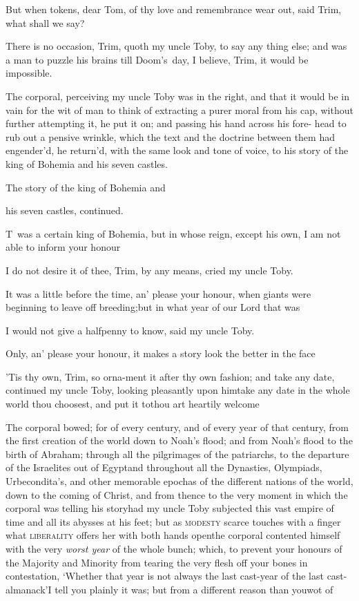 \documentclass{article}
\begin{document}
\tsh But when tokens, dear Tom, of thy love and
remembrance wear out, said Trim, what shall we say?

There is no occasion, Trim, quoth my uncle Toby,
to say any thing else; and was a man to puzzle his brains till
Doom’s~day, I believe, Trim, it would be
impossible.

The corporal, perceiving my uncle Toby was in the right,
and that it would be in vain for the wit of man to think of
extracting a purer moral from his cap, without further attempting
it, he put it on; and passing his hand across his fore- head to rub
out a pensive wrinkle, which the text and the doctrine between them
had engender’d, he return’d, with the same look and
tone of voice, to his story of the king of Bohemia and his
seven castles.

\vfill {} \eject\null\smallskip
\centerline{The story of the king of Bohemia and}
\centerline{his seven castles, continued.}

\lettrine{T}{\,} was a certain king of\break
Bohemia, but in whose reign, except his
own, I am not able to inform your honour\tsh

I do not desire it of thee, Trim, by any means, cried my
uncle Toby.

\tsh It was a little before the time, an’ please
your honour, when giants were beginning to leave off
breeding;\tsk\break but in what year of our Lord that\break
was\tsh{}

\tsh I would not give a halfpenny to know, said my uncle
Toby.

\tsh Only, an’ please your honour, it makes a
story look the better in the face\tsh

\tsh ’Tis thy own, Trim, so orna-\break ment it
after thy own fashion; and take any date, continued my uncle Toby,\break
looking pleasantly upon him\tsk take any date in the
whole world thou choosest, and put it to\tsk thou art heartily
welcome\tsh

The corporal bowed; for of every century, and of every year of
that century, from the first creation of the world down to
Noah’s flood; and from Noah’s flood to
the birth of Abraham; through all the pilgrimages of the
patriarchs, to the departure of the Israelites out of
Egypt\tsh and throughout all the Dynasties,
Olympiads, Urbecondita’s, and other memorable epochas of the
different nations of the world, down to the coming of Christ, and
from thence to the very moment in which the corporal was telling
his story\tsh had my uncle Toby subjected this vast
empire of time and all its abysses at his feet; but as \textsc{modesty} scarce touches with a
finger what \textsc{liberality} offers her with both hands
open\tsk the corporal contented himself with the very \textit{worst
year} of the whole bunch; which, to prevent your honours of the
Majority and Minority from tearing the very flesh off your bones in
contestation, ‘Whether that year is not always the last
cast-year of the last cast-almanack’\tsh I tell you
plainly it was; but from a different reason than you\break wot of\tsh
\end{document}
